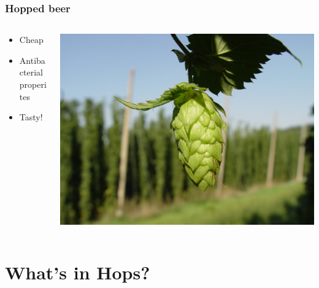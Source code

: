\documentclass{beamer}
\begin{document}
\begin{frame}\frametitle{Hopped beer}
  \begin{columns}
    \begin{column}{0.6\textwidth}
    \begin{itemize}
    \item Cheap
    \item Antibacterial properites
    \item Tasty!
    \end{itemize}
  \end{column}
  \begin{column}{0.5\textwidth}
    \begin{center}
      \centering  \includegraphics[width=\linewidth]{./brewing/hops/Hopfendolde-mit-hopfengarten.jpg}
    \end{center}
  \end{column}
  \end{columns}
\end{frame}

\section{What's in Hops?}
\end{document}

